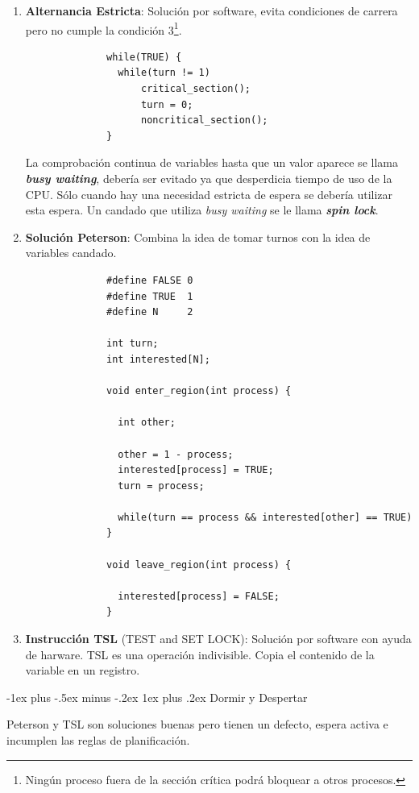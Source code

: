 \documentclass[10pt,portrait, twocolumn]{article}
\makeatletter
\renewcommand{\subsubsection}{\@startsection{subsubsection}{3}{0mm}%
                                {-1ex plus -.5ex minus -.2ex}%
                                {1ex plus .2ex}%
                                {\normalfont\small\bfseries}}
\makeatother
\begin{document}
\begin{enumerate}
		\item \textbf{Alternancia Estricta}: Solución por software, evita condiciones de carrera pero no cumple la condición 3\footnote{Ningún proceso fuera de la sección crítica podrá bloquear a otros procesos.}.
		
			  \begin{verbatim}
			  while(TRUE) {
			  	while(turn != 1)
					critical_section();
					turn = 0;
					noncritical_section();
			  }
			  \end{verbatim}
			  
		La comprobación continua de variables hasta que un valor aparece se llama \textbf{\textit{busy waiting}}, debería ser evitado ya que desperdicia tiempo de uso de la CPU. Sólo cuando hay una necesidad estricta de espera se debería utilizar esta espera. Un candado que utiliza \textit{busy waiting} se le llama \textbf{\textit{spin lock}}.
			
		\item \textbf{Solución Peterson}: Combina la idea de tomar turnos con la idea de variables candado.
		
		
		\begin{verbatim}
			  #define FALSE 0
			  #define TRUE  1
			  #define N     2
			  
			  int turn;
			  int interested[N];
			  
			  void enter_region(int process) {
			  
			  	int other;
				
				other = 1 - process;
				interested[process] = TRUE;
				turn = process;
				
				while(turn == process && interested[other] == TRUE)
			  }
			  
			  void leave_region(int process) {
			  
			  	interested[process] = FALSE;
			  }
			  \end{verbatim}
		
		\item \textbf{Instrucción TSL} (TEST and SET LOCK): Solución por software con ayuda de harware. TSL es una operación indivisible. Copia el contenido de la variable en un registro.
	\end{enumerate}
	
\subsubsection{Dormir y Despertar}

Peterson y TSL son soluciones buenas pero tienen un defecto, espera activa e incumplen las reglas de planificación.\\
\end{document}
